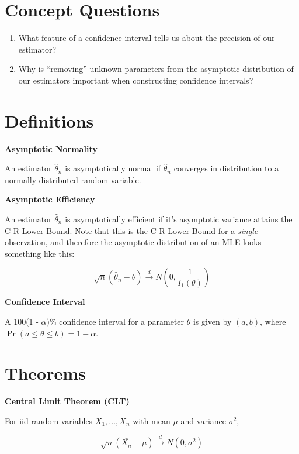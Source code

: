 \documentclass[
  letterpaper,
  DIV=11,
  numbers=noendperiod]{scrreprt}
\begin{document}
\section{Concept Questions}\label{concept-questions-5}

\begin{enumerate}
\def\labelenumi{\arabic{enumi}.}
\item
  What feature of a confidence interval tells us about the precision of
  our estimator?
\item
  Why is ``removing'' unknown parameters from the asymptotic
  distribution of our estimators important when constructing confidence
  intervals?
\end{enumerate}

\section{Definitions}\label{definitions-5}

\textbf{Asymptotic Normality}

An estimator \(\hat{\theta}_n\) is asymptotically normal if
\(\hat{\theta}_n\) converges in distribution to a normally distributed
random variable.

\textbf{Asymptotic Efficiency}

An estimator \(\hat{\theta}_n\) is asymptotically efficient if it's
asymptotic variance attains the C-R Lower Bound. Note that this is the
C-R Lower Bound for a \emph{single} observation, and therefore the
asymptotic distribution of an MLE looks something like this:

\[
\sqrt{n} (\hat{\theta}_n - \theta) \overset{d}{\to} N\left( 0, \frac{1}{I_1(\theta)}\right)
\]

\textbf{Confidence Interval}

A 100(1 - \(\alpha\))\% confidence interval for a parameter \(\theta\)
is given by \((a, b)\), where
\(\Pr(a \leq \theta \leq b) = 1 - \alpha\).

\section{Theorems}\label{theorems-5}

\textbf{Central Limit Theorem (CLT)}

For iid random variables \(X_1, \dots, X_n\) with mean \(\mu\) and
variance \(\sigma^2\),

\[
\sqrt{n} (\bar{X_n} - \mu) \overset{d}{\to} N(0, \sigma^2)
\]
\end{document}
